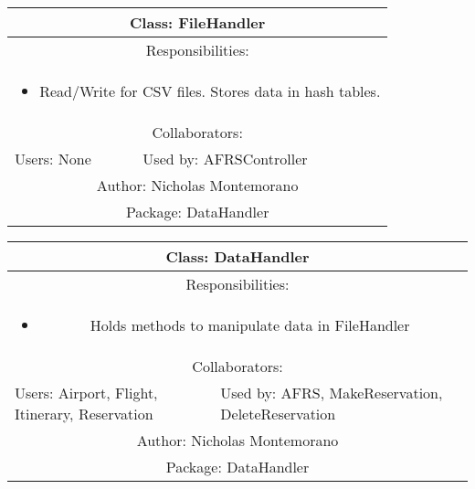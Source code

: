 \begin{center}
    \begin{tabular}{ |p{7cm}|p{7cm}|  }
        \hline
        \multicolumn{2}{|c|}{Class: FileHandler} \\
        \hline
        \multicolumn{2}{|c|}{Responsibilities:} \\ \multicolumn{2}{|c|}{\parbox{0.9\textwidth}{
        \begin{itemize}
            \item Read/Write for CSV files. Stores data in hash tables.
        \end{itemize} }} \\
        \hline
        \multicolumn{2}{|c|}{Collaborators:} \\
        \hline
        Users: None & Used by: AFRSController \\
        \hline
        \multicolumn{2}{|c|}{Author: Nicholas Montemorano} \\
        \hline
        \multicolumn{2}{|c|}{Package: DataHandler} \\
        \hline
    \end{tabular}
\end{center}

\begin{center}
    \begin{tabular}{ |p{7cm}|p{7cm}|  }
        \hline
        \multicolumn{2}{|c|}{Class: DataHandler} \\
        \hline
        \multicolumn{2}{|c|}{Responsibilities:} \\ \multicolumn{2}{|c|}{\parbox{0.9\textwidth}{
        \begin{itemize}
            \item Holds methods to manipulate data in FileHandler
        \end{itemize} }} \\
        \hline
        \multicolumn{2}{|c|}{Collaborators:} \\
        \hline
        Users: Airport, Flight, Itinerary, Reservation & Used by: AFRS, MakeReservation, DeleteReservation \\
        \hline
        \multicolumn{2}{|c|}{Author: Nicholas Montemorano} \\
        \hline
        \multicolumn{2}{|c|}{Package: DataHandler} \\
        \hline
    \end{tabular}
\end{center}

